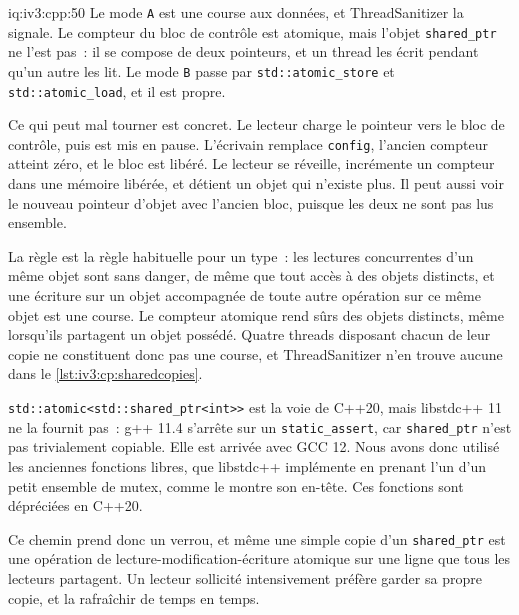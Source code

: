 \begin{solution}{iq:iv3:cpp:50}
Le mode \texttt{A} est une course aux données, et ThreadSanitizer la signale. Le compteur du bloc de contrôle est atomique, mais l'objet \texttt{shared\_ptr} ne l'est pas~: il se compose de deux pointeurs, et un thread les écrit pendant qu'un autre les lit. Le mode \texttt{B} passe par \texttt{std::atomic\_store} et \texttt{std::atomic\_load}, et il est propre.

Ce qui peut mal tourner est concret. Le lecteur charge le pointeur vers le bloc de contrôle, puis est mis en pause. L'écrivain remplace \texttt{config}, l'ancien compteur atteint zéro, et le bloc est libéré. Le lecteur se réveille, incrémente un compteur dans une mémoire libérée, et détient un objet qui n'existe plus. Il peut aussi voir le nouveau pointeur d'objet avec l'ancien bloc, puisque les deux ne sont pas lus ensemble.

La règle est la règle habituelle pour un type~: les lectures concurrentes d'un même objet sont sans danger, de même que tout accès à des objets distincts, et une écriture sur un objet accompagnée de toute autre opération sur ce même objet est une course. Le compteur atomique rend sûrs des objets distincts, même lorsqu'ils partagent un objet possédé. Quatre threads disposant chacun de leur copie ne constituent donc pas une course, et ThreadSanitizer n'en trouve aucune dans le \cref{lst:iv3:cp:sharedcopies}.
\enlargethispage{-6\baselineskip}%
\label{lst:iv3:cp:sharedcopies}

\texttt{std::atomic<std::shared\_ptr<int>{}>} est la voie de C++20, mais libstdc++ 11 ne la fournit pas~: g++ 11.4 s'arrête sur un \texttt{static\_assert}, car \texttt{shared\_ptr} n'est pas trivialement copiable. Elle est arrivée avec GCC 12. Nous avons donc utilisé les anciennes fonctions libres, que libstdc++ implémente en prenant l'un d'un petit ensemble de mutex, comme le montre son en-tête. Ces fonctions sont dépréciées en C++20.

Ce chemin prend donc un verrou, et même une simple copie d'un \texttt{shared\_ptr} est une opération de lecture-modification-écriture atomique sur une ligne que tous les lecteurs partagent. Un lecteur sollicité intensivement préfère garder sa propre copie, et la rafraîchir de temps en temps.

\end{solution}

